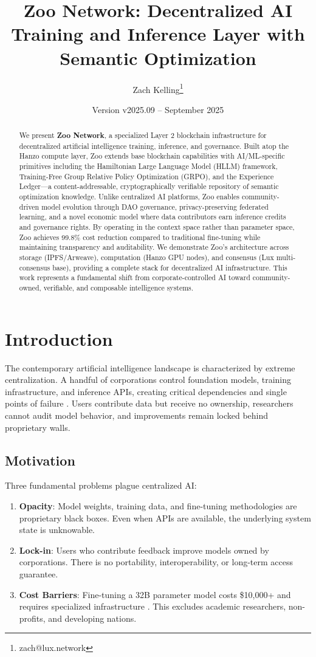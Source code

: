 \documentclass[11pt,a4paper]{article}
\title{\textbf{Zoo Network: Decentralized AI Training and Inference Layer with Semantic Optimization}}
\author[1]{Zach Kelling\thanks{zach@lux.network}}
\affil[1]{\textit{Hanzo Industries \quad Lux Industries \quad Zoo Labs Foundation}, \texttt{research@lux.network}}
\date{Version v2025.09 -- September 2025}
\begin{document}
\zoocoverpage

\begin{abstract}
We present \textbf{Zoo Network}, a specialized Layer 2 blockchain infrastructure for decentralized artificial intelligence training, inference, and governance. Built atop the Hanzo compute layer, Zoo extends base blockchain capabilities with AI/ML-specific primitives including the Hamiltonian Large Language Model (HLLM) framework, Training-Free Group Relative Policy Optimization (GRPO), and the Experience Ledger—a content-addressable, cryptographically verifiable repository of semantic optimization knowledge. Unlike centralized AI platforms, Zoo enables community-driven model evolution through DAO governance, privacy-preserving federated learning, and a novel economic model where data contributors earn inference credits and governance rights. By operating in the context space rather than parameter space, Zoo achieves 99.8\% cost reduction compared to traditional fine-tuning while maintaining transparency and auditability. We demonstrate Zoo's architecture across storage (IPFS/Arweave), computation (Hanzo GPU nodes), and consensus (Lux multi-consensus base), providing a complete stack for decentralized AI infrastructure. This work represents a fundamental shift from corporate-controlled AI toward community-owned, verifiable, and composable intelligence systems.
\end{abstract}

\section{Introduction}

The contemporary artificial intelligence landscape is characterized by extreme centralization. A handful of corporations control foundation models, training infrastructure, and inference APIs, creating critical dependencies and single points of failure \cite{bender2021dangers}. Users contribute data but receive no ownership, researchers cannot audit model behavior, and improvements remain locked behind proprietary walls.

\subsection{Motivation}

Three fundamental problems plague centralized AI:

\begin{enumerate}[leftmargin=*]
\item \textbf{Opacity}: Model weights, training data, and fine-tuning methodologies are proprietary black boxes. Even when APIs are available, the underlying system state is unknowable.
\item \textbf{Lock-in}: Users who contribute feedback improve models owned by corporations. There is no portability, interoperability, or long-term access guarantee.
\item \textbf{Cost Barriers}: Fine-tuning a 32B parameter model costs \$10,000+ and requires specialized infrastructure \cite{tencent2025grpo}. This excludes academic researchers, non-profits, and developing nations.
\end{enumerate}
\end{document}
